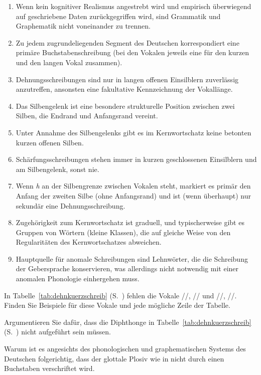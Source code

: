 \Zusammenfassung

\begin{enumerate}\Lf
  \item Wenn kein kognitiver Realismus angestrebt wird und empirisch überwiegend auf geschriebene Daten zurückgegriffen wird, sind Grammatik und Graphematik nicht voneinander zu trennen.
  \item Zu jedem zugrundeliegenden Segment des Deutschen korrespondiert eine primäre Buchstabenschreibung (bei den Vokalen jeweils eine für den kurzen und den langen Vokal zusammen).
  \item Dehnungsschreibungen sind nur in langen offenen Einsilblern zuverlässig anzutreffen, ansonsten eine fakultative Kennzeichnung der Vokallänge.
  \item Das Silbengelenk ist eine besondere strukturelle Position zwischen zwei Silben, die Endrand und Anfangsrand vereint.
  \item Unter Annahme des Silbengelenks gibt es im Kernwortschatz keine betonten kurzen offenen Silben.
  \item Schärfungsschreibungen stehen immer in kurzen geschlossenen Einsilblern und am Silbengelenk, sonst nie.
  \item Wenn \textit{h} an der Silbengrenze zwischen Vokalen steht, markiert es primär den Anfang der zweiten Silbe (ohne Anfangsrand) und ist (wenn überhaupt) nur sekundär eine Dehnungsschreibung.
  \item Zugehörigkeit zum Kernwortschatz ist graduell, und typischerweise gibt es Gruppen von Wörtern (kleine Klassen), die auf gleiche Weise von den Regularitäten des Kernwortschatzes abweichen.
  \item Hauptquelle für anomale Schreibungen sind Lehnwörter, die die Schreibung der Gebersprache konservieren, was allerdings nicht notwendig mit einer anomalen Phonologie einhergehen muss.
\end{enumerate}

\Uebungen

\Uebung \label{u141} In Tabelle~\ref{tab:dehnkuerzschreib} (S.~\pageref{tab:dehnkuerzschreib}) fehlen die Vokale //, // und /\textipa{\o}/, /\textipa{\oe}/.
Finden Sie Beispiele für diese Vokale und jede mögliche Zeile der Tabelle.

\Uebung[\tristar] \label{u142} Argumentieren Sie dafür, dass die Diphthonge in Tabelle~\ref{tab:dehnkuerzschreib} (S.~\pageref{tab:dehnkuerzschreib}) nicht aufgeführt sein müssen.

\Uebung[\tristar] \label{u143} Warum ist es angesichts des phonologischen und graphematischen Systems des Deutschen folgerichtig, dass der glottale Plosiv wie in \textipa{[PEnd@]} nicht durch einen Buchstaben verschriftet wird.

